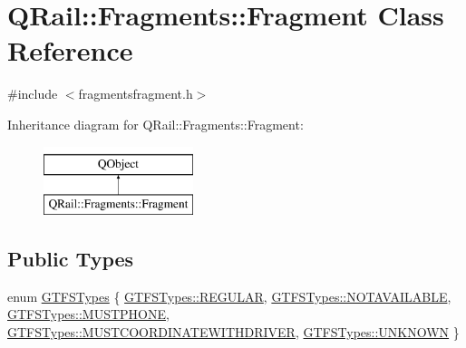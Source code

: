 \hypertarget{classQRail_1_1Fragments_1_1Fragment}{}\section{Q\+Rail\+::Fragments\+::Fragment Class Reference}
\label{classQRail_1_1Fragments_1_1Fragment}


{\ttfamily \#include $<$fragmentsfragment.\+h$>$}

Inheritance diagram for Q\+Rail\+::Fragments\+::Fragment\+:\begin{figure}[H]
\begin{center}
\leavevmode
\includegraphics[height=2.000000cm]{classQRail_1_1Fragments_1_1Fragment}
\end{center}
\end{figure}
\subsection*{Public Types}
\begin{DoxyCompactItemize}
\item 
enum \mbox{\hyperlink{classQRail_1_1Fragments_1_1Fragment_ae3c308ba6dec16f36ecc5dba59f35af3}{G\+T\+F\+S\+Types}} \{ \newline
\mbox{\hyperlink{classQRail_1_1Fragments_1_1Fragment_ae3c308ba6dec16f36ecc5dba59f35af3a820ead78f0fa32544c7ba38fe7ff53d9}{G\+T\+F\+S\+Types\+::\+R\+E\+G\+U\+L\+AR}}, 
\mbox{\hyperlink{classQRail_1_1Fragments_1_1Fragment_ae3c308ba6dec16f36ecc5dba59f35af3ae91bde0dd79ec49e6be53e755f5ee50d}{G\+T\+F\+S\+Types\+::\+N\+O\+T\+A\+V\+A\+I\+L\+A\+B\+LE}}, 
\mbox{\hyperlink{classQRail_1_1Fragments_1_1Fragment_ae3c308ba6dec16f36ecc5dba59f35af3af0ff2a305960c2e09841f026437832f2}{G\+T\+F\+S\+Types\+::\+M\+U\+S\+T\+P\+H\+O\+NE}}, 
\mbox{\hyperlink{classQRail_1_1Fragments_1_1Fragment_ae3c308ba6dec16f36ecc5dba59f35af3a1fe19352daa8176196020cda772e2eab}{G\+T\+F\+S\+Types\+::\+M\+U\+S\+T\+C\+O\+O\+R\+D\+I\+N\+A\+T\+E\+W\+I\+T\+H\+D\+R\+I\+V\+ER}}, 
\newline
\mbox{\hyperlink{classQRail_1_1Fragments_1_1Fragment_ae3c308ba6dec16f36ecc5dba59f35af3a696b031073e74bf2cb98e5ef201d4aa3}{G\+T\+F\+S\+Types\+::\+U\+N\+K\+N\+O\+WN}}
 \}
\end{DoxyCompactItemize}

